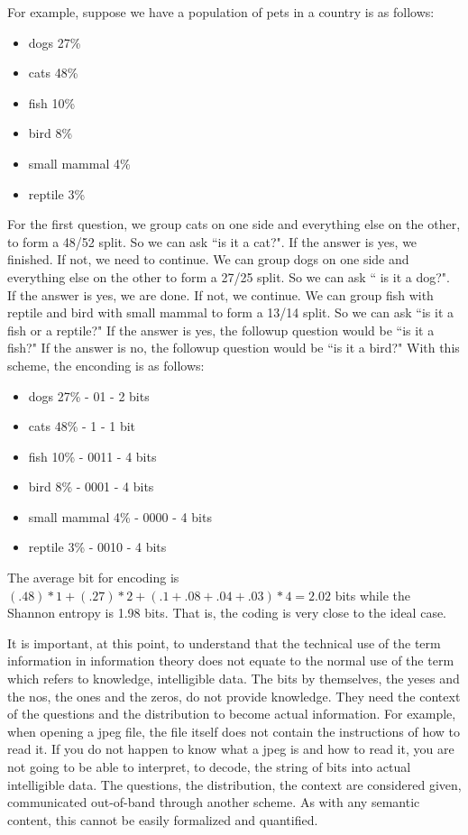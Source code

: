 \documentclass{article}
\begin{document}
For example, suppose we have a population of pets in a country is as follows:
\begin{itemize}
    \item dogs 27\%
    \item cats 48\%
    \item fish 10\%
    \item bird 8\%
    \item small mammal 4\%
    \item reptile 3\%
\end{itemize}
For the first question, we group cats on one side and everything else on the other, to form a 48/52 split. So we can ask ``is it a cat?". If the answer is yes, we finished. If not, we need to continue. We can group dogs on one side and everything else on the other to form a 27/25 split. So we can ask `` is it a dog?". If the answer is yes, we are done. If not, we continue. We can group fish with reptile and bird with small mammal to form a 13/14 split. So we can ask ``is it a fish or a reptile?" If the answer is yes, the followup question would be ``is it a fish?" If the answer is no, the followup question would be ``is it a bird?" With this scheme, the enconding is as follows:
\begin{itemize}
    \item dogs 27\% - 01 - 2 bits
    \item cats 48\% - 1 - 1 bit
    \item fish 10\% - 0011 - 4 bits
    \item bird 8\% - 0001 - 4 bits
    \item small mammal 4\% - 0000 - 4 bits
    \item reptile 3\% - 0010 - 4 bits
\end{itemize}
The average bit for encoding is $(.48) * 1 + (.27) * 2 + (.1 + .08 + .04 + .03) * 4 = 2.02$ bits while the Shannon entropy is 1.98 bits. That is, the coding is very close to the ideal case.

It is important, at this point, to understand that the technical use of the term information in information theory does not equate to the normal use of the term which refers to knowledge, intelligible data. The bits by themselves, the yeses and the nos, the ones and the zeros, do not provide knowledge. They need the context of the questions and the distribution to become actual information. For example, when opening a jpeg file, the file itself does not contain the instructions of how to read it. If you do not happen to know what a jpeg is and how to read it, you are not going to be able to interpret, to decode, the string of bits into actual intelligible data. The questions, the distribution, the context are considered given, communicated out-of-band through another scheme. As with any semantic content, this cannot be easily formalized and quantified.
\end{document}
